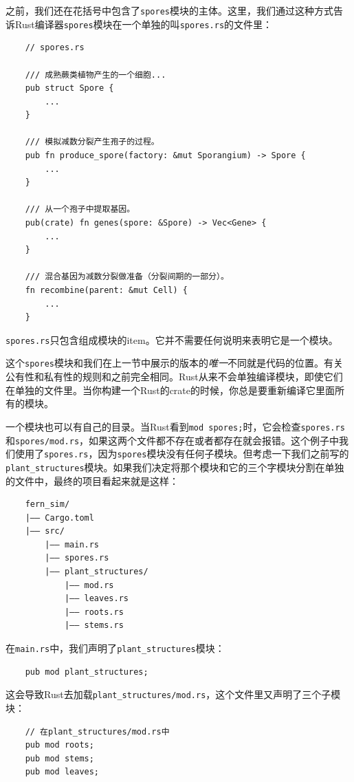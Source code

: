 之前，我们还在花括号中包含了\texttt{spores}模块的主体。这里，我们通过这种方式告诉Rust编译器\texttt{spores}模块在一个单独的叫\texttt{spores.rs}的文件里：
\begin{verbatim}
    // spores.rs

    /// 成熟蕨类植物产生的一个细胞...
    pub struct Spore {
        ...
    }

    /// 模拟减数分裂产生孢子的过程。
    pub fn produce_spore(factory: &mut Sporangium) -> Spore {
        ...
    }

    /// 从一个孢子中提取基因。
    pub(crate) fn genes(spore: &Spore) -> Vec<Gene> {
        ...
    }

    /// 混合基因为减数分裂做准备（分裂间期的一部分）。
    fn recombine(parent: &mut Cell) {
        ...
    }
\end{verbatim}

\texttt{spores.rs}只包含组成模块的item。它并不需要任何说明来表明它是一个模块。

这个\texttt{spores}模块和我们在上一节中展示的版本的\emph{唯一}不同就是代码的位置。有关公有性和私有性的规则和之前完全相同。Rust从来不会单独编译模块，即使它们在单独的文件里。当你构建一个Rust的crate的时候，你总是要重新编译它里面所有的模块。

一个模块也可以有自己的目录。当Rust看到\texttt{mod spores;}时，它会检查\texttt{spores.rs}和\texttt{spores/mod.rs}，如果这两个文件都不存在或者都存在就会报错。这个例子中我们使用了\texttt{spores.rs}，因为\texttt{spores}模块没有任何子模块。但考虑一下我们之前写的\texttt{plant\_structures}模块。如果我们决定将那个模块和它的三个字模块分割在单独的文件中，最终的项目看起来就是这样：
\begin{verbatim}
    fern_sim/
    |—— Cargo.toml
    |—— src/
        |—— main.rs
        |—— spores.rs
        |—— plant_structures/
            |—— mod.rs
            |—— leaves.rs
            |—— roots.rs
            |—— stems.rs
\end{verbatim}

在\texttt{main.rs}中，我们声明了\texttt{plant\_structures}模块：
\begin{verbatim}
    pub mod plant_structures;
\end{verbatim}

这会导致Rust去加载\texttt{plant\_structures/mod.rs}，这个文件里又声明了三个子模块：
\begin{verbatim}
    // 在plant_structures/mod.rs中
    pub mod roots;
    pub mod stems;
    pub mod leaves;
\end{verbatim}

